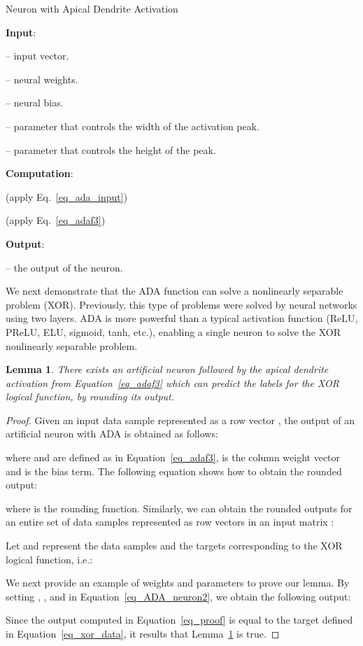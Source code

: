 \documentclass[pdflatex,sn-mathphys]{sn-jnl}
\theoremstyle{thmstyleone}
\newtheorem{lemma}[thm]{Lemma}
\theoremstyle{thmstyletwo}\newtheorem{example}{Example}\newtheorem{remark}{Remark}
\theoremstyle{thmstylethree}\newtheorem{definition}{Definition}\DeclareMathOperator{\sinc}{sinc}
\begin{document}
\begin{algorithm}[!t]
\caption{Neuron with Apical Dendrite Activation\label{alg_ADA}}
\small{
\textbf{Input}: 

 -- input vector.

 -- neural weights.

 -- neural bias.

 -- parameter that controls the width of the activation peak.

 -- parameter that controls the height of the peak.

\textbf{Computation}:

 (apply Eq.~\eqref{eq_ada_input})

 (apply Eq.~\eqref{eq_adaf3})

\textbf{Output}: 

 -- the output of the neuron.
}
\end{algorithm}


We next demonstrate that the ADA function can solve a nonlinearly separable problem (XOR). Previously, this type of problems were solved by neural networks using two layers. ADA is more powerful than a typical activation function (ReLU, PReLU, ELU, sigmoid, tanh, etc.), enabling a single neuron to solve the XOR nonlinearly separable problem.

\begin{lemma}\label{prop_ADA_learn_XOR}
There exists an artificial neuron followed by the apical dendrite activation from Equation~\eqref{eq_adaf3} which can predict the labels for the XOR logical function, by rounding its output.
\end{lemma}
\begin{proof}
Given an input data sample represented as a row vector , the output  of an artificial neuron with ADA is obtained as follows:

where  and  are defined as in Equation~\eqref{eq_adaf3},  is the column weight vector and  is the bias term. The following equation shows how to obtain the rounded output:

where  is the rounding function. Similarly, we can obtain the rounded outputs for an entire set of data samples represented as row vectors in an input matrix :


Let  and  represent the data samples and the targets corresponding to the XOR logical function, i.e.:


We next provide an example of weights and parameters\vspace{0.1cm} to prove our lemma. By setting , ,  and  in Equation~\eqref{eq_ADA_neuron2}, we obtain the following output:

Since the output  computed in Equation~\eqref{eq_proof} is equal to the target  defined in Equation~\eqref{eq_xor_data}, it results that Lemma~\ref{prop_ADA_learn_XOR} is true.
\end{proof}
\end{document}
